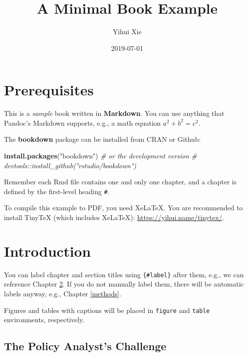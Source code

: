 \documentclass[]{book}
\title{A Minimal Book Example}
\author{Yihui Xie}
\date{2019-07-01}
\newenvironment{Shaded}{\begin{snugshade}}{\end{snugshade}}
\newcommand{\CommentTok}[1]{\textcolor[rgb]{0.56,0.35,0.01}{\textit{#1}}}
\newcommand{\KeywordTok}[1]{\textcolor[rgb]{0.13,0.29,0.53}{\textbf{#1}}}
\newcommand{\NormalTok}[1]{#1}
\newcommand{\StringTok}[1]{\textcolor[rgb]{0.31,0.60,0.02}{#1}}
\begin{document}
\maketitle

{
\setcounter{tocdepth}{1}
\tableofcontents
}
\hypertarget{prerequisites}{%
\chapter{Prerequisites}\label{prerequisites}}

This is a \emph{sample} book written in \textbf{Markdown}. You can use anything that Pandoc's Markdown supports, e.g., a math equation \(a^2 + b^2 = c^2\).

The \textbf{bookdown} package can be installed from CRAN or Github:

\begin{Shaded}
\begin{Highlighting}[]
\KeywordTok{install.packages}\NormalTok{(}\StringTok{"bookdown"}\NormalTok{)}
\CommentTok{# or the development version}
\CommentTok{# devtools::install_github("rstudio/bookdown")}
\end{Highlighting}
\end{Shaded}

Remember each Rmd file contains one and only one chapter, and a chapter is defined by the first-level heading \texttt{\#}.

To compile this example to PDF, you need XeLaTeX. You are recommended to install TinyTeX (which includes XeLaTeX): \url{https://yihui.name/tinytex/}.

\hypertarget{intro}{%
\chapter{Introduction}\label{intro}}

You can label chapter and section titles using \texttt{\{\#label\}} after them, e.g., we can reference Chapter \ref{intro}. If you do not manually label them, there will be automatic labels anyway, e.g., Chapter \ref{methods}.

Figures and tables with captions will be placed in \texttt{figure} and \texttt{table} environments, respectively.

\hypertarget{the-policy-analysts-challenge}{%
\section{The Policy Analyst's Challenge}\label{the-policy-analysts-challenge}}
\end{document}
